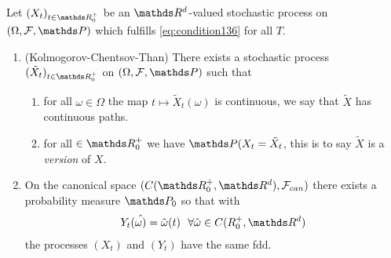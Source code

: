 \begin{cor}
Let $(X_t)_{t\in \R_0^+}$ be an $\Rd$-valued stochastic process on $(\Omega,\mathcal{F},\Prob)$ which fulfills \eqref{eq:condition136} for all $T$.
\begin{enumerate}[label=\alph*)]
\item(Kolmogorov-Chentsov-Than) There exists a stochastic process $(\tilde{X}_t)_{t \in \R_0^+}$ on $(\Omega,\mathcal{F},\Prob)$ such that
\begin{enumerate}[label=\roman*)]
\item for all $\omega \in \Omega$ the map $t \mapsto \tilde{X}_t(\omega)$ is continuous, we say that $\tilde{X}$ has continuous paths.
\item for all $ \in \R_0^+$ we have $\Prob(X_t=\tilde{X}_t$, this is to say $\tilde{X}$ is a \emph{version} of $X$.
\end{enumerate}
\item On the canonical space $(C(\R_0^+,\Rd),\mathcal{F}_{can})$
there exists a probability measure $\Prob_0$ so that with
\begin{align*}
Y_t(\hat{\omega)}=\hat{\omega}(t)~~\forall \hat{\omega} \in C(R_0^+,\Rd)
\end{align*}
the processes $(X_t)$ and $(Y_t)$ have the same fdd.
\end{enumerate}
\end{cor}

